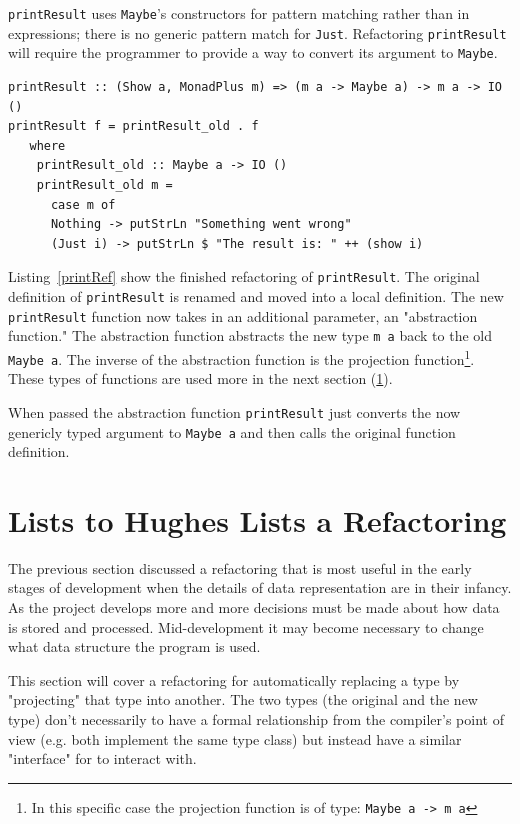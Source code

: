 \texttt{printResult} uses \texttt{Maybe}'s constructors for pattern matching rather than in expressions; there is no generic pattern match for \texttt{Just}. Refactoring \texttt{printResult} will require the programmer to provide a way to convert its argument to \texttt{Maybe}.

\begin{lstlisting}[caption={Refactored \texttt{printResult}},label=printRef]
printResult :: (Show a, MonadPlus m) => (m a -> Maybe a) -> m a -> IO ()
printResult f = printResult_old . f
   where
	printResult_old :: Maybe a -> IO ()
   	printResult_old m =
   	  case m of
  	  Nothing -> putStrLn "Something went wrong"
  	  (Just i) -> putStrLn $ "The result is: " ++ (show i)
\end{lstlisting}
 
Listing~\ref{printRef} show the finished refactoring of \texttt{printResult}. The original definition of \texttt{printResult} is renamed and moved into a local definition. The new \texttt{printResult} function now takes in an additional parameter, an "abstraction function." The abstraction function abstracts the new type \texttt{m a} back to the old \texttt{Maybe a}. The inverse of the abstraction function is the projection function\footnote{In this specific case the projection function is of type: \texttt{Maybe a -> m a}}. These types of functions are used more in the next section (\ref{listToDlist}).

When passed the abstraction function \texttt{printResult} just converts the now genericly typed argument to \texttt{Maybe a} and then calls the original function definition.
 
\section{Lists to Hughes Lists a Refactoring}\label{listToDlist}

The previous section discussed a refactoring that is most useful in the early stages of development when the details of data representation are in their infancy. As the project develops more and more decisions must be made about how data is stored and processed. Mid-development it may become necessary to change what data structure the program is used.

This section will cover a refactoring for automatically replacing a type by "projecting" that type into another. The two types (the original and the new type) don't necessarily to have a formal relationship from the compiler's point of view (e.g. both implement the same type class) but instead have a similar "interface" for to interact with. 

